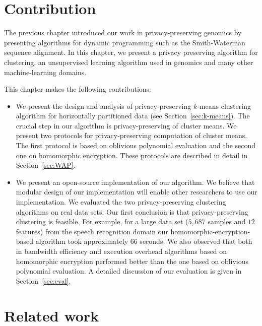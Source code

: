 
\section{Contribution}
The previous chapter introduced our work in privacy-preserving
genomics by presenting algorithms for dynamic programming such
as the Smith-Waterman sequence alignment.  In this chapter,
we present a privacy preserving algorithm for clustering, an
unsupervised learning algorithm used in genomics and many other
machine-learning domains.


This chapter makes the following contributions:

\begin{itemize}
\item We present the design and analysis of privacy-preserving $k$-means
clustering algorithm for horizontally partitioned data (see
Section~\ref{sec:k-means}). The crucial step in our algorithm is
privacy-preserving of cluster means. We present two protocols for
privacy-preserving computation of cluster means. The first protocol is
based on oblivious polynomial evaluation and the second one on
homomorphic encryption. These protocols are described in detail in
Section~\ref{sec:WAP}.

\item We present an open-source implementation of our algorithm. 
We believe that modular design of our implementation will enable other
researchers to use our implementation.  We evaluated the two privacy-preserving
clustering algorithms on real data sets. Our first conclusion is that
privacy-preserving clustering is feasible. For example, for a large
data set ($5,687$ samples and $12$ features) from the speech
recognition domain our homomorphic-encryption-based algorithm took
approximately $66$ seconds. We also observed that both in bandwidth
efficiency and execution overhead algorithms based on homomorphic
encryption performed better than the one based on oblivious polynomial
evaluation. A detailed discussion of our evaluation is given in
Section~\ref{sec:eval}.

\end{itemize}



\section{Related work}

